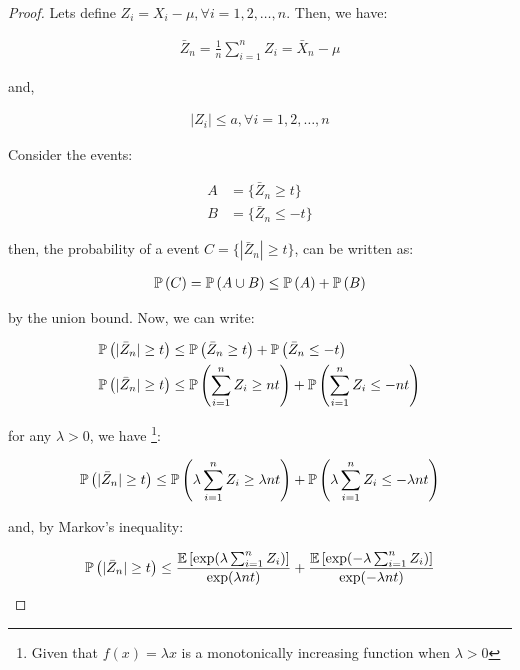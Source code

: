 \begin{proof}
Lets define $Z_i = X_i - \mu, \forall i = 1, 2, \dots, n$. Then, we have:

\begin{align*}
\bar{Z}_n = \frac{1}{n} \sum_{i=1}^n Z_i = \bar{X}_n - \mu
\end{align*}

and,

\begin{align*}
|Z_i| \leq a, \forall i = 1, 2, \dots , n
\end{align*}

Consider the events:

\begin{align*}
A &= \{\bar{Z}_n \geq t\}\\
B &= \{\bar{Z}_n \leq -t\}
\end{align*}

then, the probability of a event $C = \{|\bar{Z}_n| \geq t\}$, can be written as:

\begin{align*}
\mathbb{P}\left(C\right) &= \mathbb{P}\left(A \cup B\right) \leq \mathbb{P}\left(A\right) + \mathbb{P}\left(B\right) \\
\end{align*}

by the union bound. Now, we can write:

\begin{align*}
\mathbb{P}\left(|\bar{Z}_n| \geq t\right) &\leq \mathbb{P}\left(\bar{Z}_n \geq t\right) + \mathbb{P}\left(\bar{Z}_n \leq -t\right)\\
\mathbb{P}\left(|\bar{Z}_n| \geq t\right) &\leq \mathbb{P}\left(\sum_{i=1}^n Z_i \geq nt\right) + \mathbb{P}\left(\sum_{i=1}^n Z_i \leq -nt\right)\\
\end{align*}

for any $\lambda > 0$, we have \footnote{Given that $f(x) = \lambda x$ is a monotonically increasing function when $\lambda > 0$}:

\begin{align*}
\mathbb{P}\left(|\bar{Z}_n| \geq t\right) &\leq \mathbb{P}\left(\lambda \sum_{i=1}^n Z_i \geq \lambda nt\right) + \mathbb{P}\left(\lambda \sum_{i=1}^n Z_i \leq -\lambda nt\right)\\
\end{align*}

and, by Markov's inequality:

\begin{align*}
\mathbb{P}\left(|\bar{Z}_n| \geq t\right) &\leq
    \frac{\mathbb{E}\left[\exp(\lambda \sum_{i=1}^n Z_i)\right]}{\exp(\lambda nt)} + 
    \frac{\mathbb{E}\left[\exp(-\lambda \sum_{i=1}^n Z_i)\right]}{\exp(-\lambda nt)}\\
\end{align*}


\end{proof}
